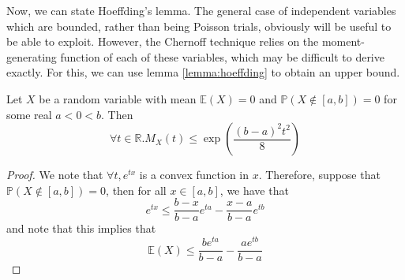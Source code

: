 	Now, we can state Hoeffding's lemma. The general case of independent variables which are 
	bounded, rather than being Poisson trials, obviously will be useful to be able to exploit. 
	However, the 
	Chernoff technique relies on the moment-generating function of each of these variables, 
	which may be difficult to derive exactly. For this, we can use lemma \ref{lemma:hoeffding} 
	to obtain an upper bound.
	\begin{lemma}
		\label{lemma:hoeffding}
		Let $X$ be a random variable with mean $\mathbb{E}(X) = 0$ and $\mathbb{P}(X 
		\notin [a,b]) = 0$ for some real $a < 0 < b$. Then 
		$$
			\forall t \in \mathbb{R} .
			M_X(t) \leq \exp\left(\frac{(b-a)^2t^2}{8}\right)
		$$
	\end{lemma}
	\begin{proof}
		We note that $\forall t, e^{tx}$ is a convex function in $x$. Therefore, suppose 
		that $\mathbb{P}(X \notin [a,b]) = 0$, then for all $x \in [a,b]$, we have that 
		$$
			e^{tx} \leq \frac{b-x}{b-a} e^{ta} - \frac{x-a}{b-a} e^{tb}
		$$
		and note that this implies that 
		$$
			\mathbb{E}(X) \leq \frac{be^{ta}}{b-a} - \frac{ae^{tb}}{b-a}
		$$
		

\end{proof}
